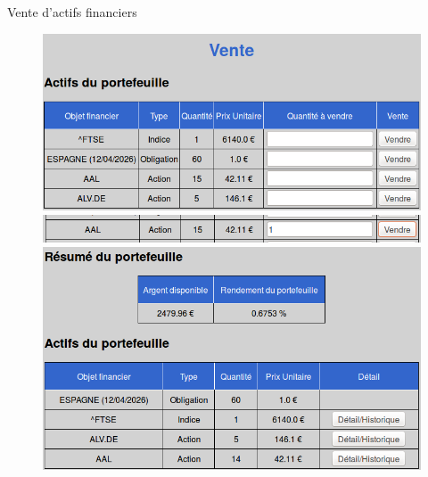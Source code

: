       Vente d'actifs financiers
      \begin{figure}[H]
	\center
	\includegraphics[scale=0.5]{../graph/7-vente.png}
	\includegraphics[scale=0.5]{../graph/7-vente1action.png}
	\includegraphics[scale=0.5]{../graph/7-accueilapresvente.png}
      \end{figure}
	

